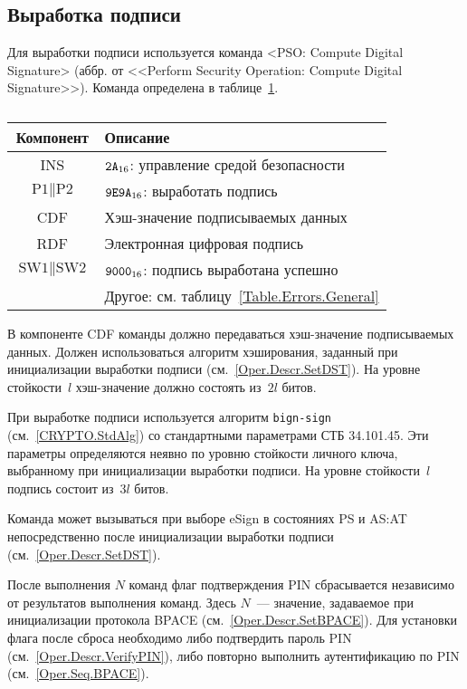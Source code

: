 \subsection{Выработка подписи}
\label{Oper.Descr.Signature}

Для выработки подписи используется 
команда <PSO: Compute Digital Signature>
(аббр. от <<Perform Security Operation: Compute Digital Signature>>).
Команда определена в таблице~\ref{Table.Oper.SignatureCmd}.

\begin{table}[hbt]
\caption{}\label{Table.Oper.SignatureCmd}
\begin{tabular}{|c|p{14cm}|}
\hline
Компонент & Описание\\ 
\hline
\hline
INS & $\texttt{2A}_{16}$: управление средой безопасности \\
\hline
$\text{P1} \parallel \text{P2}$ & $\texttt{9E9A}_{16}$: выработать подпись\\ 
\hline
CDF & Хэш-значение подписываемых данных\\
\hline 
\hline
RDF & Электронная цифровая подпись\\
\hline
$\text{SW1} \parallel \text{SW2}$ & 
  $\texttt{9000}_{16}$: подпись выработана успешно \\
\cline{2-2}
  & Другое: см. таблицу~\ref{Table.Errors.General} \\
\hline
\end{tabular}
\end{table}

В компоненте CDF команды должно передаваться хэш-значение подписываемых данных.
Должен использоваться алгоритм хэширования, заданный при инициализации 
выработки подписи (см.~\ref{Oper.Descr.SetDST}). 
%
На уровне стойкости~$l$ хэш-значение должно состоять из~$2l$ битов.

При выработке подписи используется алгоритм \texttt{bign-sign}
(см.~\ref{CRYPTO.StdAlg}) со стандартными параметрами СТБ 34.101.45.
Эти параметры определяются неявно по уровню стойкости личного ключа,
выбранному при инициализации выработки подписи.
%
На уровне стойкости~$l$ подпись состоит из~$3l$ битов.

Команда может вызываться при выборе eSign в состояниях 
PS и AS:AT непосредственно после инициализации выработки подписи
(см.~\ref{Oper.Descr.SetDST}).

После выполнения $N$ команд флаг подтверждения PIN сбрасывается независимо от 
результатов выполнения команд. Здесь $N$~--- значение, 
задаваемое при инициализации протокола BPACE (см.~\ref{Oper.Descr.SetBPACE}).
%
Для установки флага после сброса необходимо либо подтвердить пароль PIN 
(см.~\ref{Oper.Descr.VerifyPIN}), либо повторно выполнить аутентификацию по PIN 
(см.~\ref{Oper.Seq.BPACE}). 

